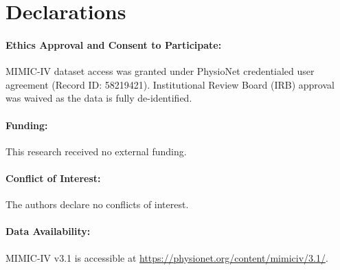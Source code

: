 \documentclass[11pt,a4paper]{article}
\begin{document}
\section*{Declarations}

\paragraph{Ethics Approval and Consent to Participate:}
MIMIC-IV dataset access was granted under PhysioNet credentialed user agreement (Record ID: 58219421). Institutional Review Board (IRB) approval was waived as the data is fully de-identified.

\paragraph{Funding:}
This research received no external funding.

\paragraph{Conflict of Interest:}
The authors declare no conflicts of interest.

\paragraph{Data Availability:}
MIMIC-IV v3.1 is accessible at \url{https://physionet.org/content/mimiciv/3.1/}.



\end{document}
